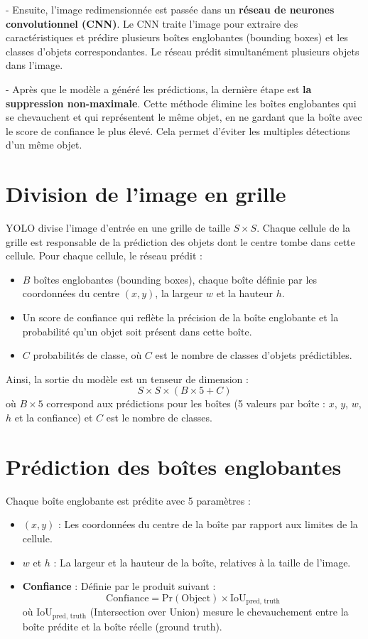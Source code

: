\documentclass[a4paper,12pt]{article}
\begin{document}
- Ensuite, l'image redimensionnée est passée dans un \textbf{réseau de neurones convolutionnel (CNN)}. Le CNN traite l'image pour extraire des caractéristiques et prédire plusieurs boîtes englobantes (bounding boxes) et les classes d'objets correspondantes. Le réseau prédit simultanément plusieurs objets dans l'image.

- Après que le modèle a généré les prédictions, la dernière étape est \textbf{la suppression non-maximale}. Cette méthode élimine les boîtes englobantes qui se chevauchent et qui représentent le même objet, en ne gardant que la boîte avec le score de confiance le plus élevé. Cela permet d'éviter les multiples détections d'un même objet.


\section{Division de l'image en grille}
YOLO divise l'image d'entrée en une grille de taille $S \times S$. Chaque cellule de la grille est responsable de la prédiction des objets dont le centre tombe dans cette cellule. Pour chaque cellule, le réseau prédit :

\begin{itemize}
    \item $B$ boîtes englobantes (bounding boxes), chaque boîte définie par les coordonnées du centre $(x, y)$, la largeur $w$ et la hauteur $h$.
    \item Un score de confiance qui reflète la précision de la boîte englobante et la probabilité qu'un objet soit présent dans cette boîte.
    \item $C$ probabilités de classe, où $C$ est le nombre de classes d'objets prédictibles.
\end{itemize}

Ainsi, la sortie du modèle est un tenseur de dimension :
\[
S \times S \times (B \times 5 + C)
\]
où $B \times 5$ correspond aux prédictions pour les boîtes (5 valeurs par boîte : $x$, $y$, $w$, $h$ et la confiance) et $C$ est le nombre de classes.

\section{Prédiction des boîtes englobantes}
Chaque boîte englobante est prédite avec 5 paramètres :
\begin{itemize}
    \item $(x, y)$ : Les coordonnées du centre de la boîte par rapport aux limites de la cellule.
    \item $w$ et $h$ : La largeur et la hauteur de la boîte, relatives à la taille de l'image.
    \item \textbf{Confiance} : Définie par le produit suivant :
    \[
    \text{Confiance} = \text{Pr}(\text{Object}) \times \text{IoU}_{\text{pred, truth}}
    \]
    où $\text{IoU}_{\text{pred, truth}}$ (Intersection over Union) mesure le chevauchement entre la boîte prédite et la boîte réelle (ground truth).
\end{itemize}
\end{document}
